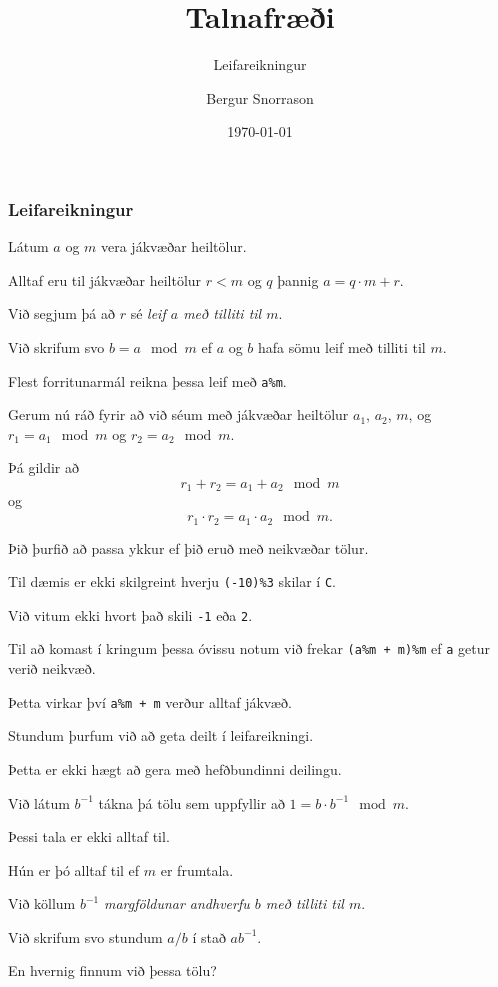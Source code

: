 \title{Talnafræði}
\subtitle{Leifareikningur}
\author{Bergur Snorrason}
\date{\today}



\frame{\titlepage}

{
	\frametitle{Leifareikningur}
	{
		\item<1-> Látum $a$ og $m$ vera jákvæðar heiltölur.
		\item<2-> Alltaf eru til jákvæðar heiltölur $r < m$ og $q$ þannig $a = q \cdot m + r$.
		\item<3-> Við segjum þá að $r$ sé \emph{leif $a$ með tilliti til $m$}.
		\item<4-> Við skrifum svo $b = a \mod m$ ef $a$ og $b$ hafa sömu leif með tilliti til $m$.
		\item<5-> Flest forritunarmál reikna þessa leif með \texttt{a\%m}.
		\item<6-> Gerum nú ráð fyrir að við séum með jákvæðar heiltölur $a_1$, $a_2$, $m$, og $r_1 = a_1 \mod m$ og $r_2 = a_2 \mod m$.
		\item<7-> Þá gildir að
		\[
			r_1 + r_2 = a_1 + a_2 \mod m
		\]
		 og
		\[
			r_1 \cdot r_2 = a_1 \cdot a_2 \mod m.
		\]
	}
}

{
	{
		\item<1-> Þið þurfið að passa ykkur ef þið eruð með neikvæðar tölur.
		\item<2-> Til dæmis er ekki skilgreint hverju \texttt{(-10)\%3} skilar í \texttt{C}.
		\item<3-> Við vitum ekki hvort það skili \texttt{-1} eða \texttt{2}.
		\item<4-> Til að komast í kringum þessa óvissu notum við frekar \texttt{(a\%m + m)\%m} ef \texttt{a} getur verið neikvæð.
		\item<5-> Þetta virkar því \texttt{a\%m + m} verður alltaf jákvæð.
	}
}

{
	{
		\item<1-> Stundum þurfum við að geta deilt í leifareikningi.
		\item<2-> Þetta er ekki hægt að gera með hefðbundinni deilingu.
		\item<3-> Við látum $b^{-1}$ tákna þá tölu sem uppfyllir að $1 = b \cdot b^{-1} \mod m$.
		\item<4-> Þessi tala er ekki alltaf til.
		\item<5-> Hún er þó alltaf til ef $m$ er frumtala.
		\item<6-> Við köllum $b^{-1}$ \emph{margföldunar andhverfu $b$ með tilliti til $m$}.
		\item<7-> Við skrifum svo stundum $a/b$ í stað $ab^{-1}$.
		\item<8-> En hvernig finnum við þessa tölu?
	}
}

